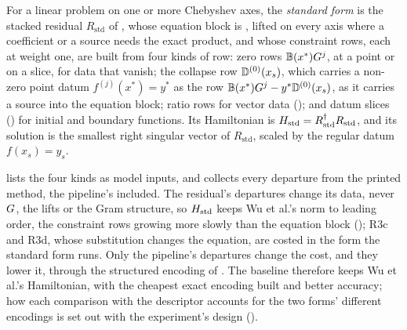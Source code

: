 \begin{definition}
\label{def:standard-form}
For a linear problem on one or more Chebyshev axes, the \emph{standard form} is the stacked residual $R_{\mathrm{std}}$ of , whose equation block is , lifted on every axis where a coefficient or a source needs the exact product, and whose constraint rows, each at weight one, are built from four kinds of row: zero rows $\mathbb{B}(x^*)G^{j}$, at a point or on a slice, for data that vanish; the collapse row $\mathbb{D}^{(0)}(x_s)$, which carries a non-zero point datum $f^{(j)}(x^*)=y^*$ as the row $\mathbb{B}(x^*)G^{j}-y^*\mathbb{D}^{(0)}(x_s)$, as it carries a source into the equation block; ratio rows for vector data (); and datum slices () for initial and boundary functions. Its Hamiltonian is $H_{\mathrm{std}}=R_{\mathrm{std}}^{\dagger}R_{\mathrm{std}}$, and its solution is the smallest right singular vector of $R_{\mathrm{std}}$, scaled by the regular datum $f(x_s)=y_s$.
\end{definition}

 lists the four kinds as model inputs, and  collects every departure from the printed method, the pipeline's included. The residual's departures change its data, never $G$, the lifts or the Gram structure, so $H_{\mathrm{std}}$ keeps Wu et al.'s norm to leading order, the constraint rows growing more slowly than the equation block (); R3c and R3d, whose substitution changes the equation, are costed in the form the standard form runs. Only the pipeline's departures change the cost, and they lower it, through the structured encoding of . The baseline therefore keeps Wu et al.'s Hamiltonian, with the cheapest exact encoding built and better accuracy; how each comparison with the descriptor accounts for the two forms' different encodings is set out with the experiment's design ().

